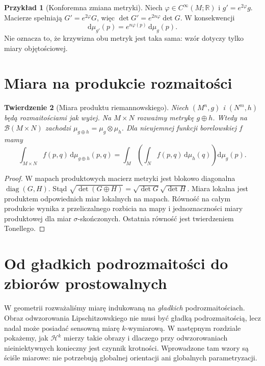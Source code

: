 \documentclass[11pt,a4paper,oneside]{book}
\numberwithin{equation}{chapter}
\theoremstyle{plain}
\newtheorem{twierdzenie}{Twierdzenie}[chapter]
\theoremstyle{definition}
\newtheorem{przyklad}[twierdzenie]{Przykład}
\theoremstyle{remark}
\begin{document}
\begin{przyklad}[Konforemna zmiana metryki]
Niech $\varphi\in C^\infty(M;\mathbb R)$ i
$g'=e^{2\varphi}g$. Macierze spełniają
$G'=e^{2\varphi}G$, więc
$\det G'=e^{2n\varphi}\det G$. W konsekwencji
\[
 \mathrm d\mu_{g'}(p)=e^{n\varphi(p)}\,\mathrm d\mu_g(p).
\]
Nie oznacza to, że krzywizna obu metryk jest
taka sama: wzór dotyczy tylko miary objętościowej.
\end{przyklad}

\section{Miara na produkcie rozmaitości}
\begin{twierdzenie}[Miara produktu riemannowskiego]
\label{thm:product-riemann-27}
Niech $(M^n,g)$ i $(N^m,h)$ będą rozmaitościami
jak wyżej. Na $M\times N$ rozważmy metrykę
$g\oplus h$. Wtedy na $\mathcal B(M\times N)$
zachodzi $\mu_{g\oplus h}=\mu_g\otimes\mu_h$.
Dla nieujemnej funkcji borelowskiej $f$ mamy
\[
 \int_{M\times N} f(p,q)\,\mathrm d\mu_{g\oplus h}(p,q)
 =\int_M\!\left(\int_N f(p,q)\,\mathrm d\mu_h(q)\right)
   \mathrm d\mu_g(p).
\]
\end{twierdzenie}
\begin{proof}
W mapach produktowych macierz metryki jest
blokowo diagonalna $\operatorname{diag}(G,H)$.
Stąd $\sqrt{\det(G\oplus H)}=
\sqrt{\det G}\sqrt{\det H}$. Miara lokalna
jest produktem odpowiednich miar lokalnych
na mapach. Równość na całym produkcie wynika
z przeliczalnego rozbicia na mapy i jednoznaczności
miary produktowej dla miar $\sigma$-skończonych.
Ostatnia równość jest twierdzeniem Tonellego.
\end{proof}

\section{Od gładkich podrozmaitości do zbiorów prostowalnych}
W geometrii rozważaliśmy miarę indukowaną
na \emph{gładkich} podrozmaitościach. Obraz
odwzorowania Lipschitzowskiego nie musi być
gładką podrozmaitością, lecz nadal może
posiadać sensowną miarę $k$-wymiarową.
W następnym rozdziale pokażemy, jak
$\mathcal H^k$ mierzy takie obrazy i dlaczego
przy odwzorowaniach nieiniektywnych konieczny
jest czynnik krotności. Wprowadzone tam wzory
są ściśle miarowe: nie potrzebują globalnej
orientacji ani globalnych parametryzacji.

\end{document}
